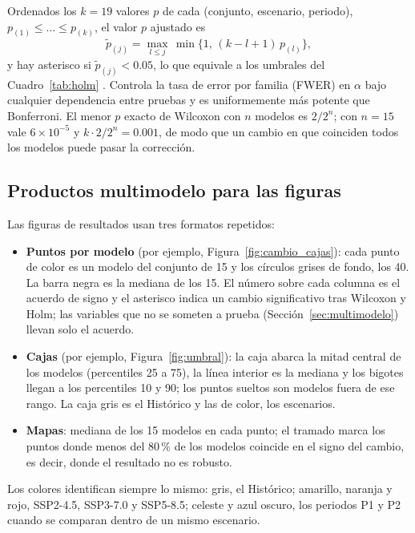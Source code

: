 \documentclass[11pt,a4paper]{article}
\begin{document}
Ordenados los $k = 19$ valores $p$ de cada (conjunto, escenario, periodo), $p_{(1)} \le \dots \le p_{(k)}$, el valor $p$ ajustado es
\begin{equation}
\label{eq:holm}
\tilde p_{(j)} = \max_{l \le j}\, \min\big\{1,\,(k-l+1)\,p_{(l)}\big\},
\end{equation}
y hay asterisco si $\tilde p_{(j)} < 0.05$, lo que equivale a los umbrales del Cuadro~\ref{tab:holm} \citep{holm1979}.
Controla la tasa de error por familia (FWER) en $\alpha$ bajo cualquier dependencia entre pruebas y es uniformemente más potente que Bonferroni.
El menor $p$ exacto de Wilcoxon con $n$ modelos es $2/2^n$; con $n = 15$ vale $6\times10^{-5}$ y $k \cdot 2/2^n = 0.001$, de modo que un cambio en que coinciden todos los modelos puede pasar la corrección.

\subsection{Productos multimodelo para las figuras}
\label{sec:ensamble}

Las figuras de resultados usan tres formatos repetidos:
\begin{itemize}[nosep,leftmargin=*]
\item \textbf{Puntos por modelo} (por ejemplo, Figura~\ref{fig:cambio_cajas}): cada punto de color es un modelo del conjunto de 15 y los círculos grises de fondo, los 40.
La barra negra es la mediana de los 15.
El número sobre cada columna es el acuerdo de signo y el asterisco indica un cambio significativo tras Wilcoxon y Holm; las variables que no se someten a prueba (Sección~\ref{sec:multimodelo}) llevan solo el acuerdo.
\item \textbf{Cajas} (por ejemplo, Figura~\ref{fig:umbral}): la caja abarca la mitad central de los modelos (percentiles 25 a 75), la línea interior es la mediana y los bigotes llegan a los percentiles 10 y 90; los puntos sueltos son modelos fuera de ese rango.
La caja gris es el Histórico y las de color, los escenarios.
\item \textbf{Mapas}: mediana de los 15 modelos en cada punto; el tramado marca los puntos donde menos del 80\,\% de los modelos coincide en el signo del cambio, es decir, donde el resultado no es robusto.
\end{itemize}
Los colores identifican siempre lo mismo: gris, el Histórico; amarillo, naranja y rojo, SSP2-4.5, SSP3-7.0 y SSP5-8.5; celeste y azul oscuro, los periodos P1 y P2 cuando se comparan dentro de un mismo escenario.
\end{document}
